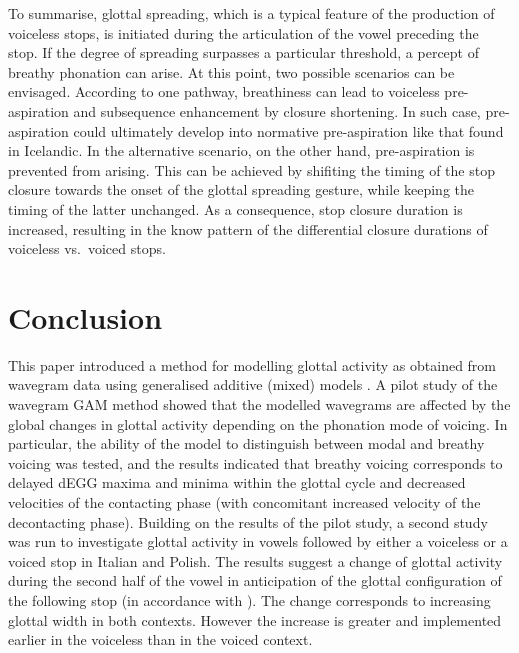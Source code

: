 \documentclass[
  11pt,
  a4paper,
]{article}
\begin{document}
To summarise, glottal spreading, which is a typical feature of the
production of voiceless stops, is initiated during the articulation of
the vowel preceding the stop. If the degree of spreading surpasses a
particular threshold, a percept of breathy phonation can arise. At this
point, two possible scenarios can be envisaged. According to one
pathway, breathiness can lead to voiceless pre-aspiration and
subsequence enhancement by closure shortening. In such case,
pre-aspiration could ultimately develop into normative pre-aspiration
like that found in Icelandic. In the alternative scenario, on the other
hand, pre-aspiration is prevented from arising. This can be achieved by
shifiting the timing of the stop closure towards the onset of the
glottal spreading gesture, while keeping the timing of the latter
unchanged. As a consequence, stop closure duration is increased,
resulting in the know pattern of the differential closure durations of
voiceless vs.~voiced stops.

\hypertarget{conclusion}{%
\section{Conclusion}\label{conclusion}}

\label{s:conclusion}

This paper introduced a method for modelling glottal activity as
obtained from wavegram data \citep{herbst2010} using generalised
additive (mixed) models \citep{hastie1986, zuur2012, wood2017}. A pilot
study of the wavegram GAM method showed that the modelled wavegrams are
affected by the global changes in glottal activity depending on the
phonation mode of voicing. In particular, the ability of the model to
distinguish between modal and breathy voicing was tested, and the
results indicated that breathy voicing corresponds to delayed dEGG
maxima and minima within the glottal cycle and decreased velocities of
the contacting phase (with concomitant increased velocity of the
decontacting phase). Building on the results of the pilot study, a
second study was run to investigate glottal activity in vowels followed
by either a voiceless or a voiced stop in Italian and Polish. The
results suggest a change of glottal activity during the second half of
the vowel in anticipation of the glottal configuration of the following
stop (in accordance with \citealt{halle1967a}). The change corresponds
to increasing glottal width in both contexts. However the increase is
greater and implemented earlier in the voiceless than in the voiced
context.
\end{document}
